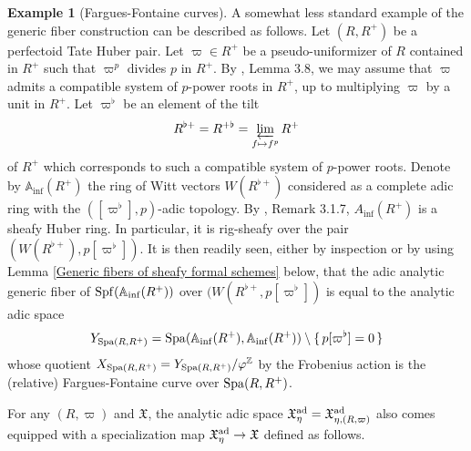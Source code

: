 \documentclass[12pt,twoside,a4paper]{article}
\theoremstyle{definition}
\newtheorem{example}[thm]{Example}
\theoremstyle{remark}
\newcommand\ad{{\rm ad}}
\newcommand\Spa{{\rm Spa}}
\newcommand\Spf{{\rm Spf}}
\begin{document}
\begin{example}[Fargues-Fontaine curves]\label{Fargues-Fontaine curves}A somewhat less standard example of the generic fiber construction can be described as follows. Let $(R, R^{+})$ be a perfectoid Tate Huber pair. Let $\varpi\in R^{+}$ be a pseudo-uniformizer of $R$ contained in $R^{+}$ such that $\varpi^{p}$ divides $p$ in $R^{+}$. By \cite{BMS}, Lemma 3.8, we may assume that $\varpi$ admits a compatible system of $p$-power roots in $R^{+}$, up to multiplying $\varpi$ by a unit in $R^{+}$. Let $\varpi^{\flat}$ be an element of the tilt \begin{equation*}R^{\flat+}=R^{+\flat}=\varprojlim_{f\mapsto f^{p}}R^{+}\end{equation*}of $R^{+}$ which corresponds to such a compatible system of $p$-power roots. Denote by $\mathbb{A}_{\inf}(R^{+})$ the ring of Witt vectors $W(R^{\flat+})$ considered as a complete adic ring with the $([\varpi^{\flat}], p)$-adic topology. By \cite{Kedlaya17}, Remark 3.1.7, $A_{\inf}(R^{+})$ is a sheafy Huber ring. In particular, it is rig-sheafy over the pair $(W(R^{\flat+}), p[\varpi^{\flat}])$. It is then readily seen, either by inspection or by using Lemma \ref{Generic fibers of sheafy formal schemes} below, that the adic analytic generic fiber of $\Spf(\mathbb{A}_{\inf}(R^{+}))$ over $(W(R^{\flat+}, p[\varpi^{\flat}])$ is equal to the analytic adic space \begin{equation*}Y_{\Spa(R, R^+)}=\Spa(\mathbb{A}_{\inf}(R^{+}), \mathbb{A}_{\inf}(R^{+}))\setminus\{\, p[\varpi^{\flat}]=0\,\}\end{equation*}whose quotient $X_{\Spa(R, R^+)}=Y_{\Spa(R, R^+)}/\varphi^{\mathbb{Z}}$ by the Frobenius action is the (relative) Fargues-Fontaine curve over $\Spa(R, R^{+})$. \end{example}
For any $(R, \varpi)$ and $\mathfrak{X}$, the analytic adic space $\mathfrak{X}_{\eta}^{\ad}=\mathfrak{X}_{\eta, (R, \varpi)}^{\ad}$ also comes equipped with a specialization map $\mathfrak{X}_{\eta}^{\ad}\to\mathfrak{X}$ defined as follows.
\end{document}
